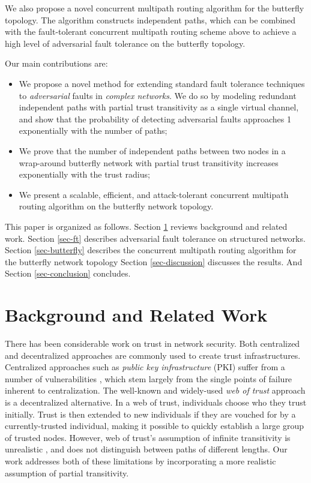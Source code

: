 \documentclass{sig-alternate-05-2015}
\begin{document}
We also propose a novel concurrent multipath routing algorithm for the butterfly
topology.
The algorithm constructs independent paths,
which can be combined with the fault-tolerant concurrent multipath routing
scheme above to
achieve a high level of adversarial fault tolerance on the butterfly topology.

Our main contributions are:
\begin{itemize}
\item{
We propose a novel method for extending standard fault tolerance techniques to
{\em adversarial} faults in {\em complex networks}.
We do so by modeling redundant independent paths
with partial trust transitivity as a single virtual channel,
and show that the probability of detecting adversarial faults
approaches 1 exponentially with the number of paths;
}
\item{We prove that the number of independent paths between two nodes
in a wrap-around butterfly network with partial trust transitivity
increases exponentially with the trust radius;
}
\item{We present a scalable, efficient, and attack-tolerant concurrent
multipath routing algorithm on the butterfly network topology.}
\end{itemize}

This paper is organized as follows.
Section \ref{sec-related} reviews background and related work.
Section \ref{sec-ft} describes adversarial fault tolerance on
structured networks.
Section \ref{sec-butterfly} describes the concurrent multipath routing
algorithm for the butterfly network topology
Section \ref{sec-discussion} discusses the results.
And Section \ref{sec-conclusion} concludes.

\section{Background and Related Work}
\label{sec-related}

There has been considerable work on trust in network security.
Both centralized and decentralized approaches are commonly used to create
trust infrastructures.
Centralized approaches such as {\em public key infrastructure} (PKI)
suffer from a number of vulnerabilities
\cite{ellison_ten_2000},
which stem largely from the single points of failure inherent to
centralization.
The well-known and widely-used {\em web of trust} approach
\cite{zimmermann_official_1995,ferguson_practical_2003}
is a decentralized alternative.
In a web of trust,
individuals choose who they trust initially.
Trust is then extended to new individuals if they are vouched for by a
currently-trusted individual,
making it possible to quickly establish a large group of trusted nodes.
However, web of trust's assumption of infinite transitivity is unrealistic
\cite{christianson_why_1997},
and does not distinguish between paths of different lengths.
Our work addresses both of these limitations by incorporating a more realistic
assumption of partial transitivity.
\end{document}
